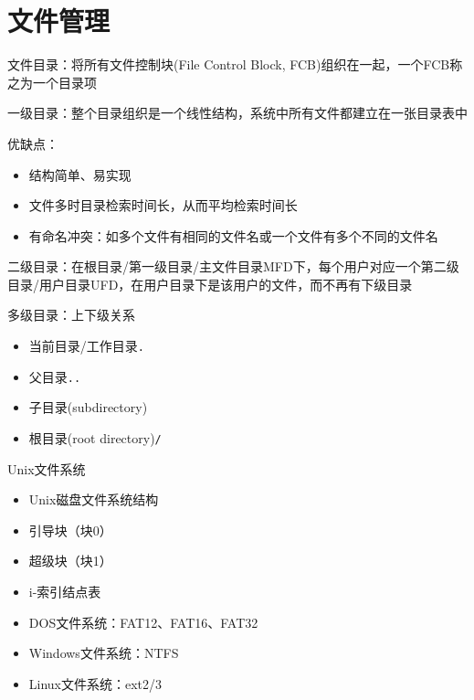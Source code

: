 
\section{文件管理}
文件目录：将所有文件控制块(File Control Block, FCB)组织在一起，一个FCB称之为一个目录项

一级目录：整个目录组织是一个线性结构，系统中所有文件都建立在一张目录表中

优缺点：
\begin{itemize}
    \item 结构简单、易实现
    \item 文件多时目录检索时间长，从而平均检索时间长
    \item 有命名冲突：如多个文件有相同的文件名或一个文件有多个不同的文件名
\end{itemize}

二级目录：在根目录/第一级目录/主文件目录MFD下，每个用户对应一个第二级目录/用户目录UFD，在用户目录下是该用户的文件，而不再有下级目录

多级目录：上下级关系
\begin{itemize}
    \item 当前目录/工作目录\verb'.'
    \item 父目录\verb'..'
    \item 子目录(subdirectory)
    \item 根目录(root directory)\verb'/'
\end{itemize}

Unix文件系统
\begin{itemize}
    \item Unix磁盘文件系统结构
    \item 引导块（块0）
    \item 超级块（块1）
    \item i-索引结点表
\end{itemize}

\begin{itemize}
\item DOS文件系统：FAT12、FAT16、FAT32
\item Windows文件系统：NTFS
\item Linux文件系统：ext2/3
\end{itemize}

